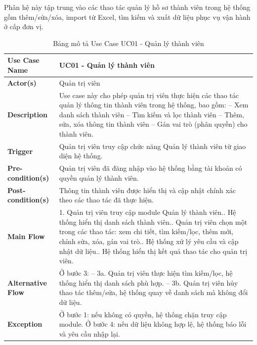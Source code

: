 Phân hệ này tập trung vào các thao tác quản lý hồ sơ thành viên trong hệ thống gồm thêm/sửa/xóa, import từ Excel, tìm kiếm và xuất dữ liệu phục vụ vận hành ở cấp đơn vị.

\begin{table}[H]
	\centering
	\renewcommand{\arraystretch}{1.25}
	\begin{tabular}{|p{3.8cm}|p{11.2cm}|}
		\hline
		\textbf{Use Case Name} & \textbf{UC01 - Quản lý thành viên} \\ \hline
		\textbf{Actor(s)} & Quản trị viên \\ \hline
		\textbf{Description} & Use case này cho phép quản trị viên thực hiện các thao tác quản lý thông tin thành viên trong hệ thống, bao gồm:\newline
		-- Xem danh sách thành viên\newline
		-- Tìm kiếm và lọc thành viên\newline
		-- Thêm, sửa, xóa thông tin thành viên\newline
		-- Gán vai trò (phân quyền) cho thành viên. \\ \hline
		\textbf{Trigger} & Quản trị viên truy cập chức năng Quản lý thành viên từ giao diện hệ thống. \\ \hline
		\textbf{Pre-condition(s)} & Quản trị viên đã đăng nhập vào hệ thống bằng tài khoản có quyền quản lý thành viên. \\ \hline
		\textbf{Post-condition(s)} & Thông tin thành viên được hiển thị và cập nhật chính xác theo các thao tác đã thực hiện. \\ \hline
		\textbf{Main Flow} & 1. Quản trị viên truy cập module Quản lý thành viên.\newline
		2. Hệ thống hiển thị danh sách thành viên.\newline
		3. Quản trị viên chọn một trong các thao tác: xem chi tiết, tìm kiếm/lọc, thêm mới, chỉnh sửa, xóa, gán vai trò.\newline
		4. Hệ thống xử lý yêu cầu và cập nhật dữ liệu.\newline
		5. Hệ thống hiển thị kết quả thao tác cho quản trị viên. \\ \hline
		\textbf{Alternative Flow} & Ở bước 3:\newline
		-- 3a. Quản trị viên thực hiện tìm kiếm/lọc, hệ thống hiển thị danh sách phù hợp.\newline
		-- 3b. Quản trị viên hủy thao tác thêm/sửa, hệ thống quay về danh sách mà không đổi dữ liệu. \\ \hline
		\textbf{Exception} & Ở bước 1: nếu không có quyền, hệ thống chặn truy cập module.\newline
		Ở bước 4: nếu dữ liệu không hợp lệ, hệ thống báo lỗi và yêu cầu nhập lại. \\ \hline
	\end{tabular}
	\caption{Bảng mô tả Use Case UC01 - Quản lý thành viên}
\end{table}

